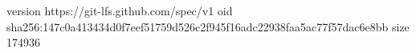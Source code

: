 version https://git-lfs.github.com/spec/v1
oid sha256:147c0a413434d0f7eef51759d526c2f945f16adc22938faa5ac77f57dac6e8bb
size 174936
